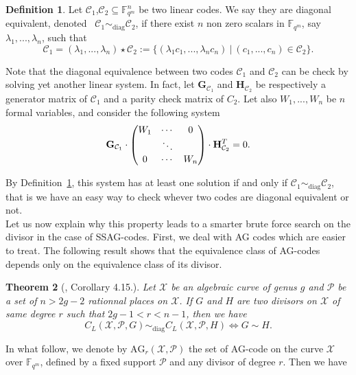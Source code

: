\documentclass[10pt]{article}
\newtheorem{thm}{Theorem}
\theoremstyle{definition}
\newtheorem{def1}[thm]{Definition}
\theoremstyle{definition}
\theoremstyle{definition}
\newcommand{\s}{\vspace{0.3cm}}
\newcommand{\cd}{\cdot}
\newcommand{\C}{\mathcal{C}}
\newcommand{\fqm}{\mathbb{F}_{q^m}}
\newcommand{\su}{\subseteq}
\newcommand{\X}{\mathcal{X}}
\newcommand{\PR}{\mathcal{P}}
\begin{document}
\s

\begin{def1} \label{diag}
Let $\C_1$,$\C_2 \su \fqm^n$ be two linear codes. We say they are diagonal equivalent, denoted \ $\C_1 \sim_{\mathrm{diag}} \C_2$, if there exist $n$ non zero scalars in $\fqm$, say $\lambda_1,...,\lambda_n$, such that 
\[\C_1 = (\lambda_1,...,\lambda_n) \star \C_2 := \{(\lambda_1c_1,...,\lambda_nc_n) \ | \ (c_1,...,c_n) \in \C_2\}.\]
\end{def1} 

Note that the diagonal equivalence between two codes $\C_1$ and $\C_2$ can be check by solving yet another linear system. In fact, let $\mathbf{G}_{\C_1}$ and $\mathbf{H}_{\C_2}$ be respectively a generator matrix of $\C_1$ and a parity check matrix of $C_2$. Let also $W_1,...,W_n$ be $n$ formal variables, and consider the following system
\begin{equation} \label{equiv}
\mathbf{G}_{\C_1} \cd \begin{pmatrix}
W_1 & \cdots & 0 \\
\null & \ddots & \null \\
0 & \cdots & W_n
\end{pmatrix} \cd \mathbf{H}_{\C_2}^T = 0.
\end{equation}

By Definition~\ref{diag}, this system has at least one solution if and only if $\C_1 \sim_{\mathrm{diag}} \C_2$, that is we have an easy way to check whever two codes are diagonal equivalent or not. \\
Let us now explain why this property leads to a smarter brute force search on the divisor in the case of SSAG-codes. First, we deal with AG codes which are easier to treat. The following result shows that the equivalence class of AG-codes depends only on the equivalence class of its divisor.


\s

\begin{thm} [\cite{CMRP}, Corollary 4.15.]  \label{thmequiv}
Let $\X$ be an algebraic curve of genus $g$ and $\PR$ be a set of $n>2g-2$ rationnal places on $\X$. If $G$ and $H$ are two divisors on $\X$ of same degree $r$ such that $2g-1 < r < n-1$, then we have 
\[C_L(\X,\PR,G) \sim_{\mathrm{diag}} C_L(\X,\PR,H) \iff G \sim H.\]
\end{thm}

\s

In what follow, we denote by $\mathrm{AG}_r(\X,\PR)$ the set of AG-code on the curve $\X$ over $\fqm$, defined by a fixed support $\PR$ and any divisor of degree $r$. Then we have 
\end{document}

